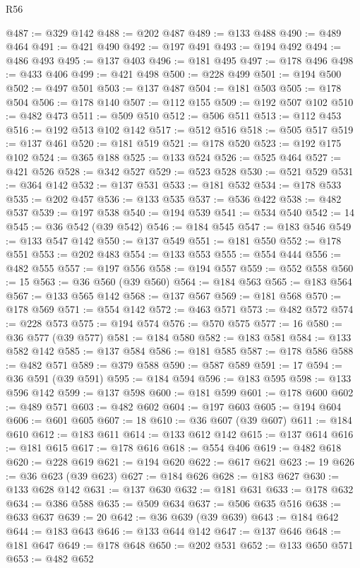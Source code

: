 \begin{lexlean}{R56}
\begin{coremodule}
@487 := @329 @142
@488 := @202 @487
@489 := @133 @488
@490 := @489 @464
@491 := @421 @490
@492 := @197 @491
@493 := @194 @492
@494 := @486 @493
@495 := @137 @403
@496 := @181 @495
@497 := @178 @496
@498 := @433 @406
@499 := @421 @498
@500 := @228 @499
@501 := @194 @500
@502 := @497 @501
@503 := @137 @487
@504 := @181 @503
@505 := @178 @504
@506 := @178 @140
@507 := @112 @155
@509 := @192 @507 @102
@510 := @482 @473
@511 := @509 @510
@512 := @506 @511
@513 := @112 @453
@516 := @192 @513 @102 @142
@517 := @512 @516
@518 := @505 @517
@519 := @137 @461
@520 := @181 @519
@521 := @178 @520
@523 := @192 @175 @102
@524 := @365 @188
@525 := @133 @524
@526 := @525 @464
@527 := @421 @526
@528 := @342 @527
@529 := @523 @528
@530 := @521 @529
@531 := @364 @142
@532 := @137 @531
@533 := @181 @532
@534 := @178 @533
@535 := @202 @457
@536 := @133 @535
@537 := @536 @422
@538 := @482 @537
@539 := @197 @538
@540 := @194 @539
@541 := @534 @540
@542 := 14
@545 := @36 @542 (@39 @542)
@546 := @184 @545
@547 := @183 @546
@549 := @133 @547 @142
@550 := @137 @549
@551 := @181 @550
@552 := @178 @551
@553 := @202 @483
@554 := @133 @553
@555 := @554 @444
@556 := @482 @555
@557 := @197 @556
@558 := @194 @557
@559 := @552 @558
@560 := 15
@563 := @36 @560 (@39 @560)
@564 := @184 @563
@565 := @183 @564
@567 := @133 @565 @142
@568 := @137 @567
@569 := @181 @568
@570 := @178 @569
@571 := @554 @142
@572 := @463 @571
@573 := @482 @572
@574 := @228 @573
@575 := @194 @574
@576 := @570 @575
@577 := 16
@580 := @36 @577 (@39 @577)
@581 := @184 @580
@582 := @183 @581
@584 := @133 @582 @142
@585 := @137 @584
@586 := @181 @585
@587 := @178 @586
@588 := @482 @571
@589 := @379 @588
@590 := @587 @589
@591 := 17
@594 := @36 @591 (@39 @591)
@595 := @184 @594
@596 := @183 @595
@598 := @133 @596 @142
@599 := @137 @598
@600 := @181 @599
@601 := @178 @600
@602 := @489 @571
@603 := @482 @602
@604 := @197 @603
@605 := @194 @604
@606 := @601 @605
@607 := 18
@610 := @36 @607 (@39 @607)
@611 := @184 @610
@612 := @183 @611
@614 := @133 @612 @142
@615 := @137 @614
@616 := @181 @615
@617 := @178 @616
@618 := @554 @406
@619 := @482 @618
@620 := @228 @619
@621 := @194 @620
@622 := @617 @621
@623 := 19
@626 := @36 @623 (@39 @623)
@627 := @184 @626
@628 := @183 @627
@630 := @133 @628 @142
@631 := @137 @630
@632 := @181 @631
@633 := @178 @632
@634 := @386 @588
@635 := @509 @634
@637 := @506 @635 @516
@638 := @633 @637
@639 := 20
@642 := @36 @639 (@39 @639)
@643 := @184 @642
@644 := @183 @643
@646 := @133 @644 @142
@647 := @137 @646
@648 := @181 @647
@649 := @178 @648
@650 := @202 @531
@652 := @133 @650 @571
@653 := @482 @652

\end{coremodule}
\end{lexlean}
